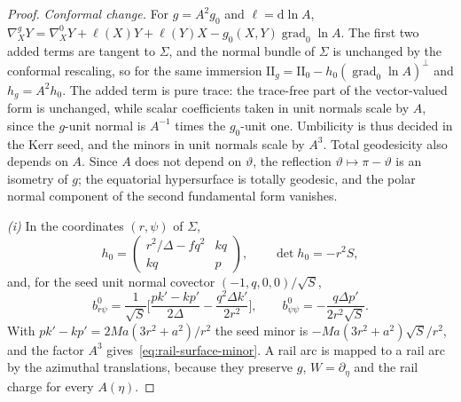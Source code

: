 \documentclass[12pt]{iopart}
\theoremstyle{plain}
\theoremstyle{definition}
\theoremstyle{remark}
\newcommand{\dd}{\mathrm{d}}
\begin{document}
\begin{proof}
\emph{Conformal change.} For $g=A^2g_0$ and $\ell=\dd\ln A$,
$\nabla^g_XY=\nabla^0_XY+\ell(X)Y+\ell(Y)X-g_0(X,Y)\operatorname{grad}_0\ln A$. The first
two added terms are tangent to $\Sigma$, and the normal bundle of $\Sigma$ is unchanged by
the conformal rescaling, so for
the same immersion $\mathrm{II}_g=\mathrm{II}_0-h_0(\operatorname{grad}_0\ln A)^\perp$ and
$h_g=A^2h_0$. The added term is pure trace: the trace-free part of the vector-valued
form is unchanged, while scalar coefficients taken in unit normals scale by $A$, since
the $g$-unit normal is $A^{-1}$ times the $g_0$-unit one. Umbilicity is thus decided in
the Kerr seed, and the minors in unit normals scale by $A^3$. Total geodesicity also
depends on $A$. Since $A$ does not depend on $\vartheta$, the reflection
$\vartheta\mapsto\pi-\vartheta$ is an isometry of $g$; the equatorial hypersurface is
totally geodesic, and the polar normal component of the second fundamental form vanishes.

\emph{(i)} In the coordinates $(r,\psi)$ of $\Sigma$,
\begin{equation}
    h_0=\begin{pmatrix}r^2/\Delta-fq^2&kq\\ kq&p\end{pmatrix},
    \qquad \det h_0=-r^2S ,
\end{equation}
and, for the seed unit normal covector $(-1,q,0,0)/\sqrt S$,
\begin{equation}
    b^0_{r\psi}=\frac{1}{\sqrt S}\Big[\frac{pk'-kp'}{2\Delta}
        -\frac{q^2\Delta k'}{2r^2}\Big],
    \qquad
    b^0_{\psi\psi}=-\frac{q\Delta p'}{2r^2\sqrt S} .
\end{equation}
With $pk'-kp'=2Ma(3r^2+a^2)/r^2$ the seed minor is $-Ma(3r^2+a^2)\sqrt S/r^2$, and the
factor $A^3$ gives~\eqref{eq:rail-surface-minor}. A rail arc is mapped to a rail arc by
the azimuthal translations, because they preserve $g$, $W=\partial_\eta$ and the rail
charge for every $A(\eta)$.


\end{proof}
\end{document}
